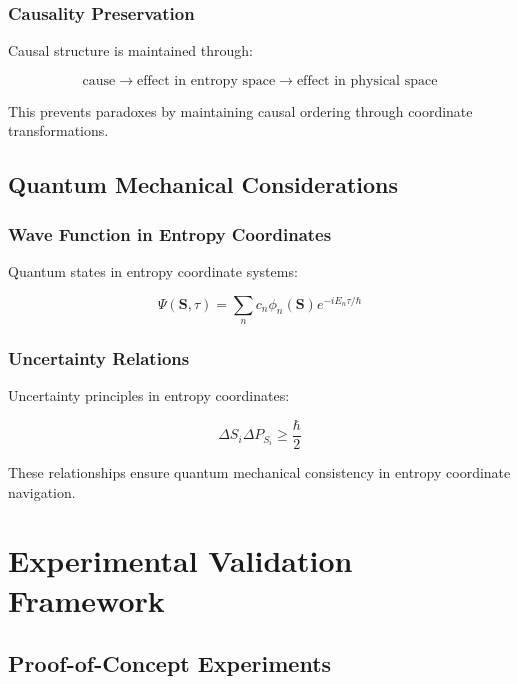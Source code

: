 \documentclass[12pt,a4paper]{article}
\begin{document}
\subsubsection{Causality Preservation}

Causal structure is maintained through:

\begin{equation}
\text{cause} \rightarrow \text{effect in entropy space} \rightarrow \text{effect in physical space}
\label{eq:causality}
\end{equation}

This prevents paradoxes by maintaining causal ordering through coordinate transformations.

\subsection{Quantum Mechanical Considerations}

\subsubsection{Wave Function in Entropy Coordinates}

Quantum states in entropy coordinate systems:

\begin{equation}
\Psi(\mathbf{S}, \tau) = \sum_n c_n \phi_n(\mathbf{S}) e^{-iE_n\tau/\hbar}
\label{eq:quantum_entropy}
\end{equation}

\subsubsection{Uncertainty Relations}

Uncertainty principles in entropy coordinates:

\begin{equation}
\Delta S_i \Delta P_{S_i} \geq \frac{\hbar}{2}
\label{eq:uncertainty_entropy}
\end{equation}

These relationships ensure quantum mechanical consistency in entropy coordinate navigation.

\section{Experimental Validation Framework}

\subsection{Proof-of-Concept Experiments}
\end{document}
